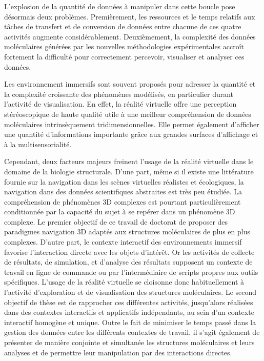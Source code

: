 L'explosion de la quantité de données à manipuler dans cette boucle pose désormais deux problèmes. Premièrement, les ressources et le temps relatifs aux tâches de transfert et de conversion de données entre chacune de ces quatre activités augmente considérablement. Deuxièmement, la complexité des données moléculaires générées par les nouvelles méthodologies expérimentales accroît fortement la difficulté pour correctement percevoir, visualiser et analyser ces données.

Les environnement immersifs sont souvent proposés pour adresser la quantité et la complexité croissante des phénomènes modélisés, en particulier durant l'activité de visualisation. En effet, la réalité virtuelle offre une perception stéréoscopique de haute qualité utile à une meilleur compréhension de données moléculaires intrinsèquement tridimensionnelles. Elle permet également d'afficher une quantité d'informations importante grâce aux grandes surfaces d'affichage et à la multisensorialité. 

Cependant, deux facteurs majeurs freinent l'usage de la réalité virtuelle dans le domaine de la biologie structurale. D'une part, même si il existe une littérature fournie sur la navigation dans les scènes virtuelles réalistes et écologiques, la navigation dans des données scientifiques abstraites est très peu étudiée. La compréhension de phénomènes 3D complexes est pourtant particulièrement conditionnée par la capacité du sujet à se repérer dans un phénomène 3D complexe. 
Le premier objectif de ce travail de doctorat de proposer des paradigmes navigation 3D adaptés aux structures moléculaires de plus en plus complexes. D'autre part, le contexte interactif des environnements immersif favorise l'interaction directe avec les objets d'intérêt. Or les activités de collecte de résultats, de simulation, et d'analyse des résultats supposent un contexte de travail en ligne de commande ou par l'intermédiaire de scripts propres aux outils spécifiques. L'usage de la réalité virtuelle se cloisonne donc habituellement à l'activité d'exploration et de visualisation des structures moléculaires. Le second objectif de thèse est de rapprocher ces différentes activités, jusqu'alors réalisées dans des contextes interactifs et applicatifs indépendants, au sein d'un contexte interactif homogène et unique. Outre le fait de minimiser le temps passé dans la gestion des données entre les différents contextes de travail, il s'agit également de présenter de manière conjointe et simultanée les structures moléculaires et leurs analyses et de permettre leur manipulation par des interactions directes.

